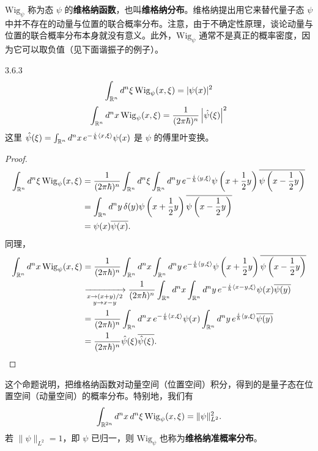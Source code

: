 \(\mathrm{Wig}_\psi\) 称为态 \(\psi\) 的\textbf{维格纳函数}，也叫\textbf{维格纳分布}。维格纳提出用它来替代量子态 \(\psi\) 中并不存在的动量与位置的联合概率分布。注意，由于不确定性原理，谈论动量与位置的联合概率分布本身就没有意义。此外，\(\mathrm{Wig}_\psi\) 通常不是真正的概率密度，因为它可以取负值（见下面谐振子的例子）。

\begin{proposition}{3.6.3}
  \[
    \int_{\mathbb{R}^n}d^n\xi\,\mathrm{Wig}_\psi(x,\xi)=|\psi(x)|^2
  \]
  \[
    \int_{\mathbb{R}^n}d^nx\,\mathrm{Wig}_\psi(x,\xi)
    =\frac{1}{(2\pi\hbar)^n}\left|\hat\psi(\xi)\right|^2
  \]
  这里 \(\hat\psi(\xi)=\int_{\mathbb{R}^n}d^nx\,e^{-\frac{i}{\hbar}\langle x,\xi\rangle}\psi(x)\) 是 \(\psi\) 的傅里叶变换。
\end{proposition}

\begin{proof}
  \begin{align*}
    \int_{\mathbb{R}^n}d^n\xi\,\mathrm{Wig}_\psi(x,\xi)
    &=\frac{1}{(2\pi\hbar)^n}\int_{\mathbb{R}^n}d^n\xi\int_{\mathbb{R}^n}d^ny\,
      e^{-\frac{i}{\hbar}\langle y,\xi\rangle}
      \psi\left(x+\frac12y\right)
      \overline{\psi\left(x-\frac12y\right)}\\
    &=\int_{\mathbb{R}^n}d^ny\,\delta(y)
      \psi\left(x+\frac12y\right)
      \overline{\psi\left(x-\frac12y\right)}\\
    &=\psi(x)\overline{\psi(x)}.
  \end{align*}
  同理，
  \begin{align*}
    \int_{\mathbb{R}^n}d^nx\,\mathrm{Wig}_\psi(x,\xi)
    &=\frac{1}{(2\pi\hbar)^n}\int_{\mathbb{R}^n}d^nx\int_{\mathbb{R}^n}d^ny\,
      e^{-\frac{i}{\hbar}\langle y,\xi\rangle}
      \psi\left(x+\frac12y\right)
      \overline{\psi\left(x-\frac12y\right)}\\
    &\xrightarrow[\substack{x\to(x+y)/2\\ y\to x-y}]{}
      \frac{1}{(2\pi\hbar)^n}\int_{\mathbb{R}^n}d^nx\int_{\mathbb{R}^n}d^ny\,
      e^{-\frac{i}{\hbar}\langle x-y,\xi\rangle}
      \psi(x)\overline{\psi(y)}\\
    &=\frac{1}{(2\pi\hbar)^n}\int_{\mathbb{R}^n}d^nx\,e^{-\frac{i}{\hbar}\langle x,\xi\rangle}
      \psi(x)\int_{\mathbb{R}^n}d^ny\,e^{\frac{i}{\hbar}\langle y,\xi\rangle}
      \overline{\psi(y)}\\
    &=\frac{1}{(2\pi\hbar)^n}\hat\psi(\xi)\overline{\hat\psi(\xi)}.
  \end{align*}
\end{proof}

这个命题说明，把维格纳函数对动量空间（位置空间）积分，得到的是量子态在位置空间（动量空间）的概率分布。特别地，我们有
\[
  \int_{\mathbb{R}^{2n}}d^nx\,d^n\xi\,\mathrm{Wig}_\psi(x,\xi)
  =\|\psi\|_{L^2}^2.
\]
若 \(\|\psi\|_{L^2}=1\)，即 \(\psi\) 已归一，则 \(\mathrm{Wig}_\psi\) 也称为\textbf{维格纳准概率分布}。

